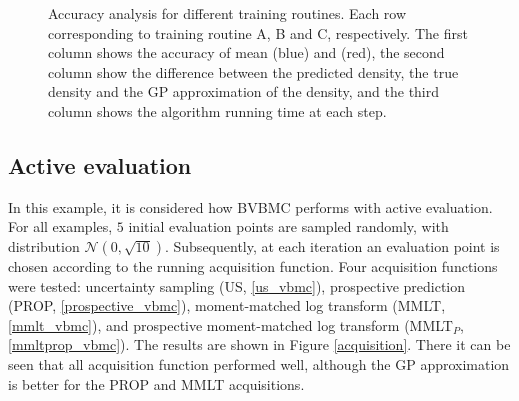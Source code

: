\begin{figure}

	\caption[Accuracy analysis for different training routines.]{\label{trainingcomparison} Accuracy analysis for different training routines. Each row corresponding to training routine A, B and C, respectively. The first column shows the accuracy of mean (blue) and (red), the second column show the difference between the predicted density, the true density and the GP approximation of the density, and the third column shows the algorithm running time at each step.}
\end{figure}

\subsection{Active evaluation}
In this example, it is considered how BVBMC performs with active evaluation. For all examples, $5$ initial evaluation points are sampled randomly, with distribution $\mathcal{N}(0,\sqrt{10})$. Subsequently, at each iteration an evaluation point is chosen according to the running acquisition function. Four acquisition functions were tested: uncertainty sampling (US, \eqref{us_vbmc}), prospective prediction (PROP, \eqref{prospective_vbmc}), moment-matched log transform (MMLT, \eqref{mmlt_vbmc}), and prospective moment-matched log transform (MMLT$_P$, \eqref{mmltprop_vbmc}). The results are shown in Figure \ref{acquisition}. There it can be seen that all acquisition function performed well, although the GP approximation is better for the PROP and MMLT acquisitions.

